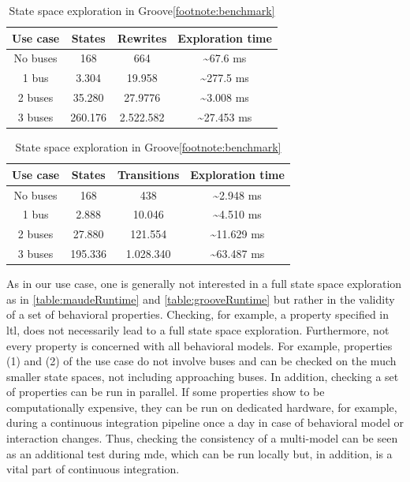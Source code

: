 \documentclass{jot}
\begin{document}
\begin{table}
\centering
\begin{tabular}{|c || c | c | c |}
 \hline
 Use case & States & Rewrites & Exploration time \\
 \hline\hline
 No buses & 168 & 664 & \textasciitilde 67.6 ms \\
 \hline
 1 bus & 3.304 & 19.958 & \textasciitilde 277.5 ms \\
 \hline
 2 buses & 35.280 & 27.9776 & \textasciitilde 3.008 ms \\
 \hline
 3 buses & 260.176 & 2.522.582 & \textasciitilde 27.453 ms \\
 \hline
\end{tabular}
\caption[State space exploration in Maude]{State space exploration in Maude\footnotemark}
\label{table:maudeRuntime}

\bigskip

\begin{tabular}{|c || c | c | c |}
 \hline
 Use case & States & Transitions & Exploration time \\
 \hline\hline
 No buses & 168 & 438 & \textasciitilde 2.948 ms \\
 \hline
 1 bus & 2.888 & 10.046 & \textasciitilde 4.510 ms \\
 \hline
 2 buses & 27.880 & 121.554 & \textasciitilde 11.629 ms \\
 \hline
 3 buses & 195.336 & 1.028.340 & \textasciitilde 63.487 ms \\
 \hline
\end{tabular}
\caption[State space exploration in Groove]{State space exploration in Groove\cref{footnote:benchmark}}
\label{table:grooveRuntime}

\end{table}


As in our use case, one is generally not interested in a full state space exploration as in \autoref{table:maudeRuntime} and \autoref{table:grooveRuntime} but rather in the validity of a set of behavioral properties.
Checking, for example, a property specified in \gls*{ltl}, does not necessarily lead to a full state space exploration.
Furthermore, not every property is concerned with all behavioral models.
For example, properties (1) and (2) of the use case do not involve buses and can be checked on the much smaller state spaces, not including approaching buses.
In addition, checking a set of properties can be run in parallel.
If some properties show to be computationally expensive, they can be run on dedicated hardware, for example, during a continuous integration pipeline once a day in case of behavioral model or interaction changes.
Thus, checking the consistency of a multi-model can be seen as an additional test during \gls*{mde}, which can be run locally but, in addition, is a vital part of continuous integration.
\end{document}
